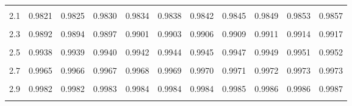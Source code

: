 \documentclass[
]{article}
\begin{document}
\begin{longtable}[l]{lcccccccccc}
\cellcolor{gray!15}{2} & \cellcolor{gray!15}{0.9771} & \cellcolor{gray!15}{0.9776} & \cellcolor{gray!15}{0.9781} & \cellcolor{gray!15}{0.9787} & \cellcolor{gray!15}{0.9792} & \cellcolor{gray!15}{0.9797} & \cellcolor{gray!15}{0.9803} & \cellcolor{gray!15}{0.9808} & \cellcolor{gray!15}{0.9814} & \cellcolor{gray!15}{0.9817}\\
2.1 & 0.9821 & 0.9825 & 0.9830 & 0.9834 & 0.9838 & 0.9842 & 0.9845 & 0.9849 & 0.9853 & 0.9857\\
\cellcolor{gray!15}{2.2} & \cellcolor{gray!15}{0.9860} & \cellcolor{gray!15}{0.9862} & \cellcolor{gray!15}{0.9866} & \cellcolor{gray!15}{0.9869} & \cellcolor{gray!15}{0.9872} & \cellcolor{gray!15}{0.9875} & \cellcolor{gray!15}{0.9878} & \cellcolor{gray!15}{0.9881} & \cellcolor{gray!15}{0.9885} & \cellcolor{gray!15}{0.9889}\\
2.3 & 0.9892 & 0.9894 & 0.9897 & 0.9901 & 0.9903 & 0.9906 & 0.9909 & 0.9911 & 0.9914 & 0.9917\\
\cellcolor{gray!15}{2.4} & \cellcolor{gray!15}{0.9919} & \cellcolor{gray!15}{0.9921} & \cellcolor{gray!15}{0.9924} & \cellcolor{gray!15}{0.9925} & \cellcolor{gray!15}{0.9927} & \cellcolor{gray!15}{0.9929} & \cellcolor{gray!15}{0.9930} & \cellcolor{gray!15}{0.9932} & \cellcolor{gray!15}{0.9935} & \cellcolor{gray!15}{0.9936}\\
2.5 & 0.9938 & 0.9939 & 0.9940 & 0.9942 & 0.9944 & 0.9945 & 0.9947 & 0.9949 & 0.9951 & 0.9952\\
\cellcolor{gray!15}{2.6} & \cellcolor{gray!15}{0.9953} & \cellcolor{gray!15}{0.9954} & \cellcolor{gray!15}{0.9955} & \cellcolor{gray!15}{0.9956} & \cellcolor{gray!15}{0.9958} & \cellcolor{gray!15}{0.9959} & \cellcolor{gray!15}{0.9960} & \cellcolor{gray!15}{0.9961} & \cellcolor{gray!15}{0.9962} & \cellcolor{gray!15}{0.9964}\\
2.7 & 0.9965 & 0.9966 & 0.9967 & 0.9968 & 0.9969 & 0.9970 & 0.9971 & 0.9972 & 0.9973 & 0.9973\\
\cellcolor{gray!15}{2.8} & \cellcolor{gray!15}{0.9974} & \cellcolor{gray!15}{0.9975} & \cellcolor{gray!15}{0.9976} & \cellcolor{gray!15}{0.9976} & \cellcolor{gray!15}{0.9977} & \cellcolor{gray!15}{0.9978} & \cellcolor{gray!15}{0.9979} & \cellcolor{gray!15}{0.9979} & \cellcolor{gray!15}{0.9980} & \cellcolor{gray!15}{0.9981}\\
2.9 & 0.9982 & 0.9982 & 0.9983 & 0.9984 & 0.9984 & 0.9984 & 0.9985 & 0.9986 & 0.9986 & 0.9987\\
\cellcolor{gray!15}{3} & \cellcolor{gray!15}{0.9987} & \cellcolor{gray!15}{0.9987} & \cellcolor{gray!15}{0.9988} & \cellcolor{gray!15}{0.9988} & \cellcolor{gray!15}{0.9989} & \cellcolor{gray!15}{0.9989} & \cellcolor{gray!15}{0.9989} & \cellcolor{gray!15}{0.9990} & \cellcolor{gray!15}{0.9990} & \cellcolor{gray!15}{0.9991}\\

\end{longtable}
\end{document}
